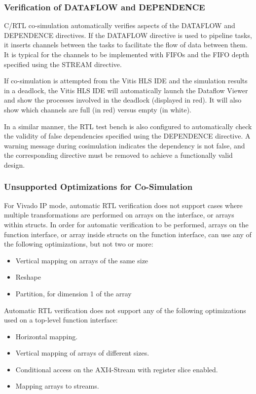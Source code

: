 \subsubsection{Verification of DATAFLOW and DEPENDENCE}
C/RTL co-simulation automatically verifies aspects of the DATAFLOW and DEPENDENCE directives. If the DATAFLOW directive is used to pipeline tasks, it inserts channels between the tasks to facilitate the flow of data between them. It is typical for the channels to be implemented with
FIFOs and the FIFO depth specified using the STREAM directive.

\par If co-simulation is attempted from the Vitis HLS IDE and the simulation results in a deadlock, the Vitis HLS IDE will automatically launch the Dataflow Viewer and show the processes involved in the deadlock (displayed in red). It will also show which channels are full (in red) versus empty (in white). 

\par In a similar manner, the RTL test bench is also configured to automatically check the validity of false dependencies specified using the DEPENDENCE directive. A warning message during cosimulation indicates the dependency is not false, and the corresponding directive must be removed to achieve a functionally valid design.

\subsubsection{Unsupported Optimizations for Co-Simulation}

For Vivado IP mode, automatic RTL verification does not support cases where multiple transformations are performed on arrays on the interface, or arrays within structs. In order for automatic verification to be performed, arrays on the function interface, or array inside structs on the function interface, can use any of the following optimizations, but not two or more:
\begin{itemize}
  \item Vertical mapping on arrays of the same size
  \item Reshape
  \item Partition, for dimension 1 of the array
\end{itemize}

Automatic RTL verification does not support any of the following optimizations used on a top-level function interface:
\begin{itemize}
  \item Horizontal mapping.
  \item Vertical mapping of arrays of different sizes.
  \item Conditional access on the AXI4-Stream with register slice enabled.
  \item Mapping arrays to streams.
\end{itemize}

